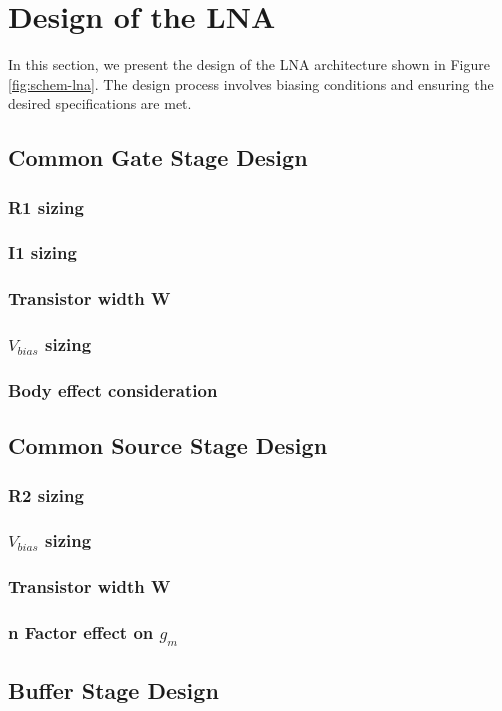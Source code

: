 \section{Design of the LNA}

In this section, we present the design of the LNA architecture shown in Figure \ref{fig:schem-lna}. The design process involves biasing conditions and ensuring the desired specifications are met.

\subsection{Common Gate Stage Design}

\subsubsection{R1 sizing}

\subsubsection{I1 sizing}

\subsubsection{Transistor width W}

\subsubsection{$V_{bias}$ sizing}

\subsubsection{Body effect consideration}

\subsection{Common Source Stage Design}

\subsubsection{R2 sizing}

\subsubsection{$V_{bias}$ sizing}

\subsubsection{Transistor width W}

\subsubsection{n Factor effect on $g_m$}

\subsection{Buffer Stage Design}